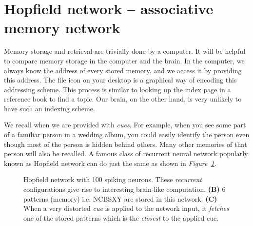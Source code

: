\documentclass[]{resonance}
\newcommand\Fig[1]{\textit{Figure~\ref{#1}}}
\begin{document}
\section{Hopfield network -- associative memory network}\label{sec:hopfield}

Memory storage and retrieval are trivially done by a computer. It will be helpful
to compare memory storage in the computer and the brain. In the computer, we
always know the address of every stored memory, and we access it by providing
this address. The file icon on your desktop is a graphical way of encoding this
addressing scheme. This process is similar to looking up the index page in a
reference book to find a topic. Our brain, on the other hand, is very unlikely
to have such an indexing scheme. 

We recall when we are provided with \textit{cues}. For example, when you see
some part of a familiar person in a wedding album, you could easily identify the
person even though most of the person is hidden behind others.  Many other
memories of that person will also be recalled. A famous class of recurrent
neural network popularly known as Hopfield network can do just the same as shown
in \Fig{fig:hopfield}.

\begin{figure}[!b]
    \centering
    \caption{Hopfield network with 100 spiking neurons. These \emph{recurrent} 
        configurations give rise to interesting brain-like
        computation. \textbf{(B)} 6 patterns (memory) i.e. NCBSXY are stored in this
        network. \textbf{(C)} When a very distorted \textit{cue} is applied to
        the network input, it \textit{fetches} one of the stored patterns which is
        the \emph{closest} to the applied cue.
    }\label{fig:hopfield}
\end{figure}
\end{document}
